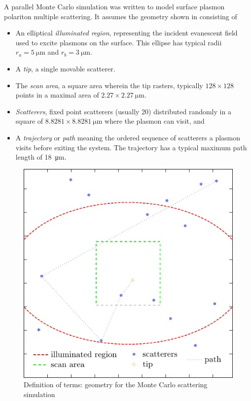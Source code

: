 A parallel Monte Carlo simulation was written to model surface plasmon
polariton multiple scattering.
It assumes the geometry shown in  consisting of
\begin{itemize}
\item An elliptical \textit{illuminated region}, representing the incident evanescent
field used to excite plasmons on the surface.  This ellipse has
typical radii $r_a=\SI{5}{\micro\meter}$ and $r_b=\SI{3}{\micro\meter}$.
\item A \textit{tip}, a single movable scatterer.
\item The \textit{scan area}, a square area wherein the tip rasters, typically
$128\times128$ points in a maximal area of $2.27\times\SI{2.27}{\micro\meter}$.
\item \textit{Scatterers}, fixed point scatterers (usually \num{20})
distributed randomly in a square of $8.8281\times\SI{8.8281}{\micro\meter}$
where the plasmon can visit, and
\item A \textit{trajectory} or \textit{path} meaning the ordered sequence of scatterers a
plasmon visits before exiting the system.  The trajectory has a typical maximum
path length of \SI{18}{\micro\meter}.
\end{itemize}
\begin{figure}[ht]
\centering
\includegraphics[keepaspectratio]{scatteringmicro/figures/montecarlogeo.pdf}
\caption{Definition of terms: geometry for the Monte Carlo scattering
simulation}
\label{fig:plasmongeo}
\end{figure}

